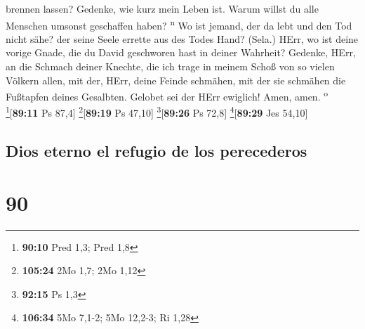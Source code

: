 brennen lassen?  Gedenke, wie kurz mein Leben ist. Warum
willst du alle Menschen umsonst geschaffen haben? \textsuperscript{n}
 Wo ist jemand, der da lebt und den Tod nicht sähe? der
seine Seele errette aus des Todes Hand? (Sela.)  HErr, wo
ist deine vorige Gnade, die du David geschworen hast in deiner Wahrheit?
 Gedenke, HErr, an die Schmach deiner Knechte, die ich
trage in meinem Schoß von so vielen Völkern allen,  mit
der, HErr, deine Feinde schmähen, mit der sie schmähen die Fußtapfen
deines Gesalbten.  Gelobet sei der HErr ewiglich! Amen,
amen. \textsuperscript{o} \footnote{\textbf{90:10} Pred 1,3; Pred 1,8}{[}\textbf{89:11}
Ps 87,4{]} \footnote{\textbf{105:24} 2Mo 1,7; 2Mo 1,12}{[}\textbf{89:19}
Ps 47,10{]} \footnote{\textbf{92:15} Ps 1,3}{[}\textbf{89:26} Ps 72,8{]}
\footnote{\textbf{106:34} 5Mo 7,1-2; 5Mo 12,2-3; Ri 1,28}{[}\textbf{89:29}
Jes 54,10{]}

\hypertarget{dios-eterno-el-refugio-de-los-perecederos}{%
\subsection{Dios eterno el refugio de los
perecederos}\label{dios-eterno-el-refugio-de-los-perecederos}}

\hypertarget{section-89}{%
\section{90}\label{section-89}}

